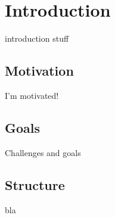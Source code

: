 \chapter{Introduction}\label{intro}

introduction stuff

\section{Motivation}

I'm motivated!

\section{Goals}

Challenges and goals

\section{Structure}

bla
